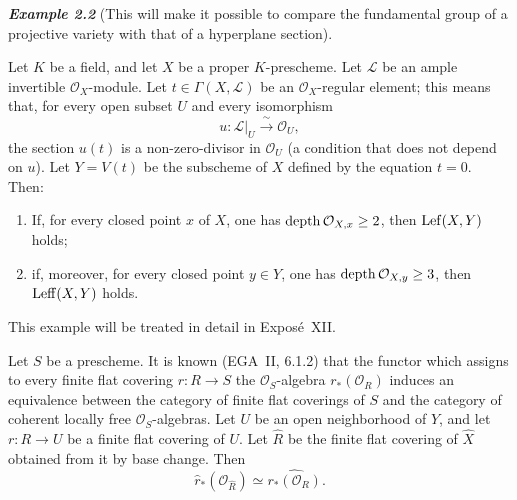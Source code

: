 \medskip
{}\noindent\textbf{\textit{Example 2.2}}\quad
\textup{(This will make it possible to compare the fundamental group of a
projective variety with that of a hyperplane section).}

Let $K$ be a field, and let $X$ be a proper $K$-prescheme. Let $\mathcal L$
be an ample invertible $\mathcal O_X$-module. Let
$t\in\Gamma(X,\mathcal L)$ be an $\mathcal O_X$-regular element; this means
that, for every open subset $U$ and every isomorphism
\[
  u\colon \mathcal L|_U \xrightarrow{\ \sim\ } \mathcal O_U,
\]
the section $u(t)$ is a non-zero-divisor in $\mathcal O_U$ (a condition that
does not depend on $u$). Let $Y=V(t)$ be the subscheme of $X$ defined by the
equation $t=0$.
Then:

\begin{enumerate}[label=(\roman*),leftmargin=2.5em]
\item If, for every closed point $x$ of $X$, one has
$\operatorname{depth}\mathcal O_{X,x}\geq2$, then $\operatorname{Lef}(X,Y)$ holds;

\item if, moreover, for every closed point $y\in Y$, one has
$\operatorname{depth}\mathcal O_{X,y}\geq3$, then $\operatorname{Leff}(X,Y)$ holds.
\end{enumerate}

\medskip
This example will be treated in detail in Exposé~XII.

\medskip
Let $S$ be a prescheme. It is known (EGA~II, 6.1.2) that the functor which
assigns to every finite flat covering $r\colon R\to S$ the
$\mathcal O_S$-algebra $r_*(\mathcal O_R)$ induces an equivalence between
the category of finite flat coverings of $S$ and the category of coherent
locally free $\mathcal O_S$-algebras.
Let $U$ be an open neighborhood of $Y$, and let $r\colon R\to U$ be a
finite flat covering of $U$. Let $\widehat R$ be the finite flat covering of
$\widehat X$ obtained from it by base change. Then
\[
  \widehat r_*(\mathcal O_{\widehat R})
  \simeq \widehat{r_*(\mathcal O_R)}.
\]

